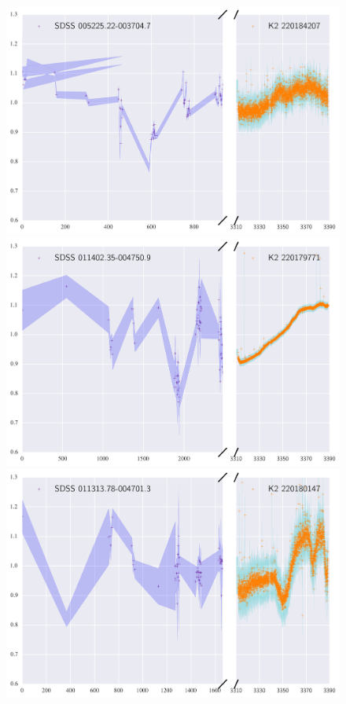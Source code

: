 \documentclass[a4paper,fleqn,usenatbib]{mnras}
\begin{document}
       \begin{figure}
 	\includegraphics[width=\columnwidth]{220184207ExtendedLC.png}
 	\includegraphics[width=\columnwidth]{220179771ExtendedLC.png}
 	\includegraphics[width=\columnwidth]{220180147ExtendedLC.png}
       	\caption{}
       	\label{fig:example_figure}
       \end{figure}
\end{document}
